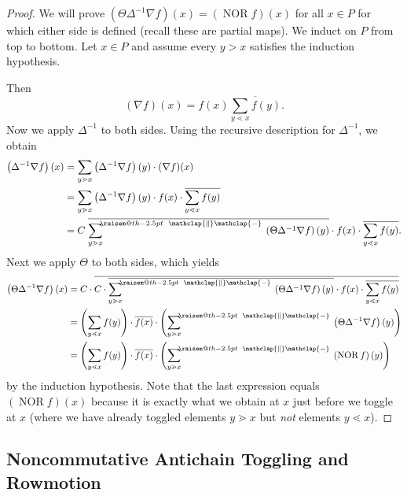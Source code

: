 \documentclass[ALCO,ThmDefs,Unicode,epreuves]{cedram}
\makeatletter
\newcommand{\defn}[1]{\emph{#1}}
\newcommand{\raisemath}[1]{\mathpalette{\raisem@th{#1}}}
\newcommand{\raisem@th}[3]{\raisebox{#1}{$#2#3$}}
\def\parallelsum{\:\ \mathclap{\|}\mathclap{-}\ \:}
\newcommand{\sumparlimitlower}[1]{{\sum\limits_{#1}}^{\hspace{-3 pt}\raisemath{-2.5pt}{\parallelsum}}\hspace{-2.9pt}}
\newcommand{\down}{\nabla}
\newcommand{\up}{\Delta}
\DeclareMathOperator{\NOR}{NOR}
\makeatother
\begin{document}
\begin{proof}
We will prove $(\Theta\up^{-1}\down f)(x)=(\NOR f)(x)$
for all $x\in P$ for which either side is defined (recall these are partial maps). We induct on $P$ from top to bottom.
Let $x\in P$ and assume
every $y>x$ satisfies the induction hypothesis.

Then 
\[
(\down f)(x) = f(x)
 \overline{\sum\limits_{y\lessdot x}f(y)}.
\]
Now we apply $\up^{-1}$ to both sides. Using the recursive
description for $\up^{-1}$, we obtain
\begin{align*}
 \left(\up^{-1}\down f\right)(x) &=
 \sum\limits_{y\gtrdot x}\left(\up^{-1}\down f\right)(y)\cdot (\down f)(x)\\
 &= \sum\limits_{y\gtrdot x}\left(\up^{-1}\down f\right)(y) \cdot f(x) \cdot \overline{\sum\limits_{y\lessdot x}f(y)}\\
 &= C\; \overline{\sumparlimitlower{y\gtrdot x} \left(\Theta \up^{-1}\down f\right)(y)} \cdot f(x) \cdot \overline{\sum\limits_{y\lessdot x}f(y)}.
\end{align*}
Next we apply $\Theta$ to both sides, which yields
\begin{align*}
 \left(\Theta \up^{-1}\down f\right)(x) &=
 C\cdot \overline{
 C\cdot \overline{\sumparlimitlower{y\gtrdot x}\left(\Theta \up^{-1}\down f\right)(y)} \cdot f(x) \cdot \overline{\sum\limits_{y\lessdot x}f(y)}}\\
 &=
 \left(\sum\limits_{y\lessdot x}f(y)\right) \cdot
 \overline{f(x)} \cdot \left( \sumparlimitlower{y\gtrdot x}\left(\Theta \up^{-1}\down f\right)(y) \right)\\
 &=
 \left(\sum\limits_{y\lessdot x}f(y)\right) \cdot
 \overline{f(x)} \cdot \left( \sumparlimitlower{y\gtrdot x}\left(\NOR f\right)(y) \right)
\end{align*}
by the induction hypothesis.
Note that the last expression equals $(\NOR f)(x)$
because it is exactly what we obtain
at $x$ just before we toggle at $x$ (where we have already toggled elements $y\gtrdot x$ but \defn{not} elements $y\lessdot x$).
\end{proof}

\subsection{Noncommutative Antichain Toggling and Rowmotion}
\end{document}
